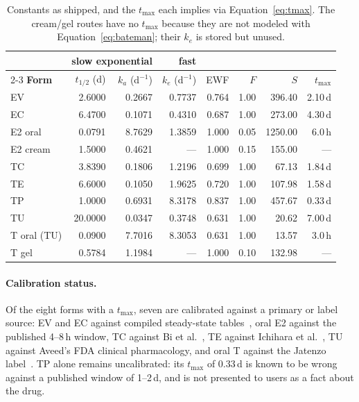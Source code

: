\documentclass[11pt,a4paper]{article}
\begin{document}
\begin{table}[h]
\centering
\small
\begin{tabular}{@{}lrrrrrrr@{}}
\toprule
& \multicolumn{2}{c}{\textbf{slow exponential}} & \textbf{fast} & & & & \\
\cmidrule(lr){2-3}
\textbf{Form} & $t_{1/2}$ (d) & $k_a$ (d$^{-1}$) & $k_e$ (d$^{-1}$)
               & EWF & $F$ & $S$ & $t_{\max}$ \\
\midrule
EV            & 2.6000 & 0.2667 & 0.7737 & 0.764 & 1.00 & 396.40 & 2.10\,d \\
EC            & 6.4700 & 0.1071 & 0.4310 & 0.687 & 1.00 & 273.00 & 4.30\,d \\
E2 oral       & 0.0791 & 8.7629 & 1.3859 & 1.000 & 0.05 & 1250.00 & 6.0\,h \\
E2 cream      & 1.5000 & 0.4621 & ---    & 1.000 & 0.15 & 155.00 & --- \\
\midrule
TC            & 3.8390 & 0.1806 & 1.2196 & 0.699 & 1.00 & 67.13 & 1.84\,d \\
TE            & 6.6000 & 0.1050 & 1.9625 & 0.720 & 1.00 & 107.98 & 1.58\,d \\
TP            & 1.0000 & 0.6931 & 8.3178 & 0.837 & 1.00 & 457.67 & 0.33\,d \\
TU            & 20.0000 & 0.0347 & 0.3748 & 0.631 & 1.00 & 20.62 & 7.00\,d \\
T oral (TU)   & 0.0900 & 7.7016 & 8.3053 & 0.631 & 1.00 & 13.57 & 3.0\,h \\
T gel         & 0.5784 & 1.1984 & ---    & 1.000 & 0.10 & 132.98 & --- \\
\bottomrule
\end{tabular}
\caption{Constants as shipped, and the $t_{\max}$ each implies via
Equation~\ref{eq:tmax}. The cream/gel routes have no $t_{\max}$ because
they are not modeled with Equation~\ref{eq:bateman}; their $k_e$ is
stored but unused.}
\label{tab:constants}
\end{table}

\paragraph{Calibration status.} Of the eight forms with a $t_{\max}$,
seven are calibrated against a primary or label source: EV and EC
against compiled steady-state tables~\cite{tfs}, oral E2 against the
published 4--8\,h window, TC against Bi et al.~\cite{bi2018}, TE against
Ichihara et al.~\cite{ichihara2020}, TU against Aveed's FDA clinical
pharmacology, and oral T against the Jatenzo label~\cite{swerdloff2020}.
TP alone remains uncalibrated: its $t_{\max}$ of 0.33\,d is known to be
wrong against a published window of 1--2\,d, and is not presented to
users as a fact about the drug.
\end{document}
